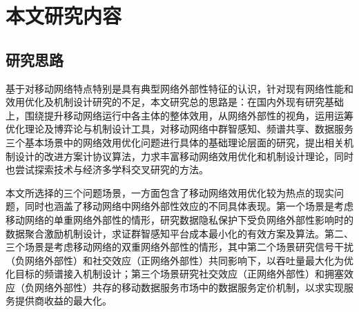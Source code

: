 \section{本文研究内容}


\subsection{研究思路}

基于对移动网络特点特别是具有典型网络外部性特征的认识，针对现有网络性能和效用优化及机制设计研究的不足，本文研究总的思路是：在国内外现有研究基础上，围绕提升移动网络运行中各主体的整体效用，从网络外部性的视角，运用运筹优化理论及博弈论与机制设计工具，对移动网络中群智感知、频谱共享、数据服务三个基本场景中的网络效用优化问题进行具体的基础理论层面的研究，提出相关机制设计的改进方案计协议算法，力求丰富移动网络效用优化和机制设计理论，同时也尝试探索技术与经济多学科交叉研究的方法。

本文所选择的三个问题场景，一方面包含了移动网络效用优化较为热点的现实问题，同时也涵盖了移动网络中网络外部性效应的不同具体表现。第一个场景是考虑移动网络的单重网络外部性的情形，研究数据隐私保护下受负网络外部性影响时的数据聚合激励机制设计，求证群智感知平台成本最小化的有效方案及算法。第二、三个场景是考虑移动网络的双重网络外部性的情形，其中第二个场景研究信号干扰（负网络外部性）和社交效应（正网络外部性）共同影响下，以吞吐量最大化为优化目标的频谱接入机制设计；第三个场景研究社交效应（正网络外部性）和拥塞效应（负网络外部性）共存的移动数据服务市场中的数据服务定价机制，以求实现服务提供商收益的最大化。


